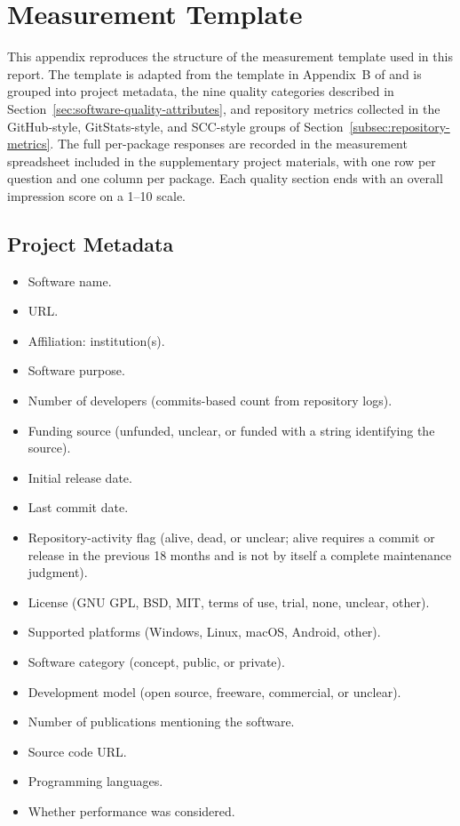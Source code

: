 \chapter{Measurement Template}
\label{appendix:measurement-template}

This appendix reproduces the structure of the measurement template used in this report. The template is adapted from the template in Appendix~B of \citet{Smith2021} and is grouped into project metadata, the nine quality categories described in Section~\ref{sec:software-quality-attributes}, and repository metrics collected in the GitHub-style, GitStats-style, and SCC-style groups of Section~\ref{subsec:repository-metrics}. The full per-package responses are recorded in the measurement spreadsheet included in the supplementary project materials, with one row per question and one column per package. Each quality section ends with an overall impression score on a 1--10 scale.

\section*{Project Metadata}

\begin{itemize}
    \item Software name.
    \item URL.
    \item Affiliation: institution(s).
    \item Software purpose.
    \item Number of developers (commits-based count from repository logs).
    \item Funding source (unfunded, unclear, or funded with a string identifying the source).
    \item Initial release date.
    \item Last commit date.
    \item Repository-activity flag (alive, dead, or unclear; alive requires a commit or release in the previous 18 months and is not by itself a complete maintenance judgment).
    \item License (GNU GPL, BSD, MIT, terms of use, trial, none, unclear, other).
    \item Supported platforms (Windows, Linux, macOS, Android, other).
    \item Software category (concept, public, or private).
    \item Development model (open source, freeware, commercial, or unclear).
    \item Number of publications mentioning the software.
    \item Source code URL.
    \item Programming languages.
    \item Whether performance was considered.
\end{itemize}

